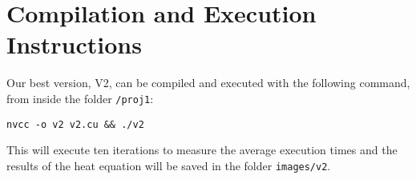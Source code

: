 \documentclass[conference]{IEEEtran}
\begin{document}
\section{Compilation and Execution Instructions}
Our best version, V2, can be compiled and executed with the following command, from inside the folder \texttt{/proj1}:
\begin{verbatim}
nvcc -o v2 v2.cu && ./v2
\end{verbatim}
This will execute ten iterations to measure the average execution times and the results of the heat equation will be saved in the folder \texttt{images/v2}.


\printbibliography
\end{document}

